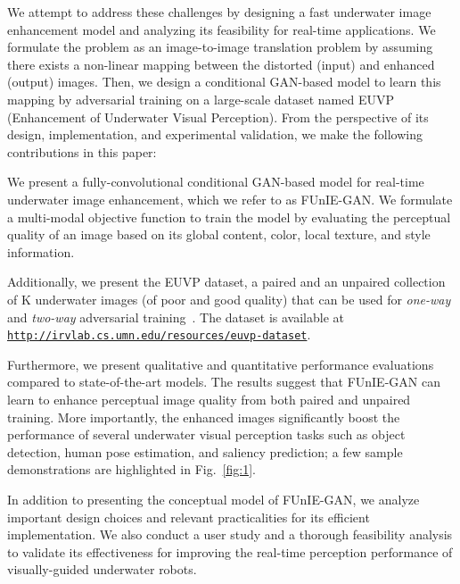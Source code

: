 \documentclass[10pt,twocolumn,letterpaper]{article}
\begin{document}
We attempt to address these challenges by designing a fast underwater image enhancement model and analyzing its feasibility for real-time applications. We formulate the problem as an image-to-image translation problem by assuming there exists a non-linear mapping between the distorted (input) and enhanced (output) images.  
Then, we design a conditional GAN-based model to learn this mapping by adversarial training on a large-scale dataset named EUVP (Enhancement of Underwater Visual Perception). 
From the perspective of its design, implementation, and experimental validation, we make the following contributions in this paper: 
\begin{compactenum}[(a)]
\vspace{1mm}
\item We present a fully-convolutional conditional GAN-based model for real-time underwater image enhancement, which we refer to as FUnIE-GAN. We formulate a multi-modal objective function to train the model by evaluating the perceptual quality of an image based on its global content, color, local texture, and style information.    

\vspace{1mm}
\item Additionally, we present the EUVP dataset, a paired and an unpaired collection of K underwater images (of poor and good quality) that can be used for \textit{one-way} and \textit{two-way} adversarial training~\cite{chen2018deep,zhu2017unpaired}. The dataset is available at {\tt\url{http://irvlab.cs.umn.edu/resources/euvp-dataset}}.


\vspace{1mm}
\item Furthermore, we present qualitative and quantitative performance evaluations compared to state-of-the-art models. The results suggest that FUnIE-GAN can learn to enhance perceptual image quality from both paired and unpaired training. More importantly, the enhanced images significantly boost the performance of several underwater visual perception tasks such as object detection, human pose estimation, and saliency prediction; a few sample demonstrations are highlighted in Fig.~\ref{fig:1}.
\end{compactenum}
\vspace{1mm}

In addition to presenting the conceptual model of FUnIE-GAN, we analyze important design choices and relevant practicalities for its efficient implementation. We also conduct a user study and a thorough feasibility analysis to validate its effectiveness for improving the real-time perception performance of visually-guided underwater robots. 
\end{document}
